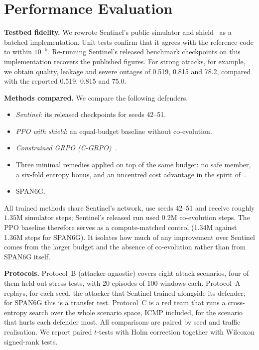 \documentclass[conference]{IEEEtran}
\begin{document}
\section{Performance Evaluation}
\label{sec:eval}
\textbf{Testbed fidelity.} We rewrote Sentinel's public simulator and shield~\cite{sentinelcode} as a batched implementation. Unit tests confirm that it agrees with the reference code to within $10^{-5}$. Re-running Sentinel's released benchmark checkpoints on this implementation recovers the published figures. For strong attacks, for example, we obtain quality, leakage and severe outages of 0.519, 0.815 and 78.2, compared with the reported 0.519, 0.815 and 75.0.

\textbf{Methods compared.} We compare the following defenders.
\begin{itemize}
\item \emph{Sentinel}: its released checkpoints for seeds 42--51.
\item \emph{PPO with shield}: an equal-budget baseline without co-evolution.
\item \emph{Constrained GRPO (C-GRPO)}~\cite{girgis2026cgrpo}.
\item Three minimal remedies applied on top of the same budget: no safe member, a six-fold entropy bonus, and an uncentred cost advantage in the spirit of~\cite{nie2026starvation}.
\item SPAN6G.
\end{itemize}
All trained methods share Sentinel's network, use seeds 42--51 and receive roughly $1.35$M simulator steps; Sentinel's released run used $0.2$M co-evolution steps. The PPO baseline therefore serves as a compute-matched control (1.34M against 1.36M steps for SPAN6G). It isolates how much of any improvement over Sentinel comes from the larger budget and the absence of co-evolution rather than from SPAN6G itself.

\textbf{Protocols.} Protocol~B (attacker-agnostic) covers eight attack scenarios, four of them held-out stress tests, with 20 episodes of 100 windows each. Protocol~A replays, for each seed, the attacker that Sentinel trained alongside its defender; for SPAN6G this is a transfer test. Protocol~C is a red team that runs a cross-entropy search over the whole scenario space, ICMP included, for the scenario that hurts each defender most. All comparisons are paired by seed and traffic realisation. We report paired $t$-tests with Holm correction together with Wilcoxon signed-rank tests.
\end{document}
